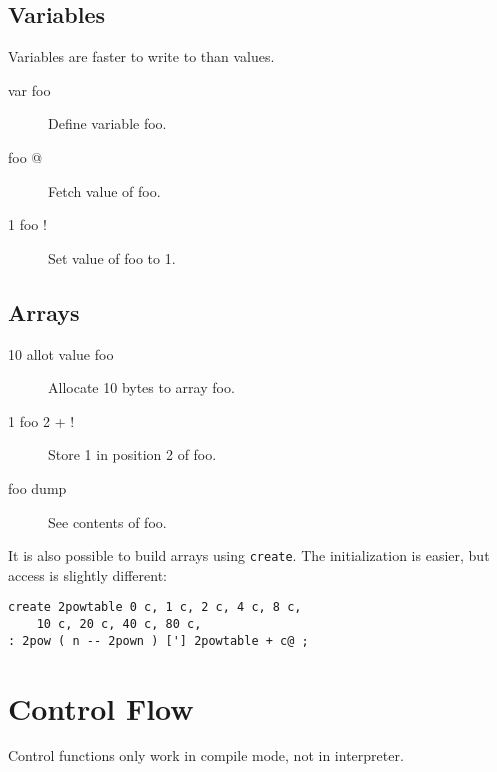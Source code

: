 \subsection{Variables}

Variables are faster to write to than values.

\begin{description}
\item[var foo] Define variable foo.
\item[foo @] Fetch value of foo.
\item[1 foo !] Set value of foo to 1.
\end{description}

\subsection{Arrays}

\begin{description}
\item[10 allot value foo] Allocate 10 bytes to array foo.
\item[1 foo 2 + !] Store 1 in position 2 of foo.
\item[foo dump] See contents of foo.
\end{description}

It is also possible to build arrays using \texttt{create}. The initialization is easier, but access is slightly different:

\begin{verbatim}
create 2powtable 0 c, 1 c, 2 c, 4 c, 8 c,
	10 c, 20 c, 40 c, 80 c,
: 2pow ( n -- 2pown ) ['] 2powtable + c@ ;
\end{verbatim}


\section{Control Flow}

Control functions only work in compile mode, not in interpreter.

